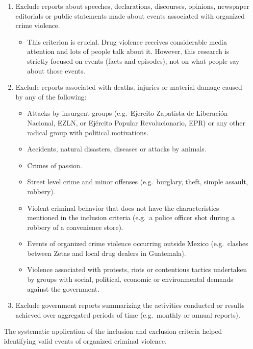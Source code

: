 \documentclass[12pt,letterpaper]{article}
\begin{document}
\begin{enumerate} %
    \item Exclude reports about speeches, declarations, discourses, opinions, newspaper editorials or public statements made about events associated with organized crime violence. 
        \begin{itemize} %
        \item This criterion is crucial. Drug violence receives considerable media attention and lots of people talk about it. However, this research is strictly focused on events (facts and episodes), not on what people say about those events. 
        \end{itemize}
    \item Exclude reports associated with deaths, injuries or material damage caused by any of the following:
        \begin{itemize} %
        \item  Attacks by insurgent groups (e.g.\ Ejercito Zapatista de Liberaci\'{o}n Nacional, EZLN, or Ej\'{e}rcito Popular Revolucionario, EPR) or any other radical group with political motivations.
        \item  Accidents, natural disasters, diseases or attacks by animals.
        \item  Crimes of passion.
        \item  Street level crime and minor offenses (e.g.\ burglary, theft, simple assault, robbery). 
        \item  Violent criminal behavior that does not have the characteristics mentioned in the inclusion criteria (e.g.\ a police officer shot during a robbery of a convenience store).
        \item  Events of organized crime violence occurring outside Mexico (e.g.\ clashes between Zetas and local drug dealers in Guatemala).
        \item  Violence associated with protests, riots or contentious tactics undertaken by groups with social, political, economic or environmental demands against the government.
        \end{itemize}
    \item Exclude government reports summarizing the activities conducted or results achieved over aggregated periods of time (e.g.\ monthly or annual reports). 
\end{enumerate}

The systematic application of the inclusion and exclusion criteria helped identifying valid events of organized criminal violence.
\end{document}
